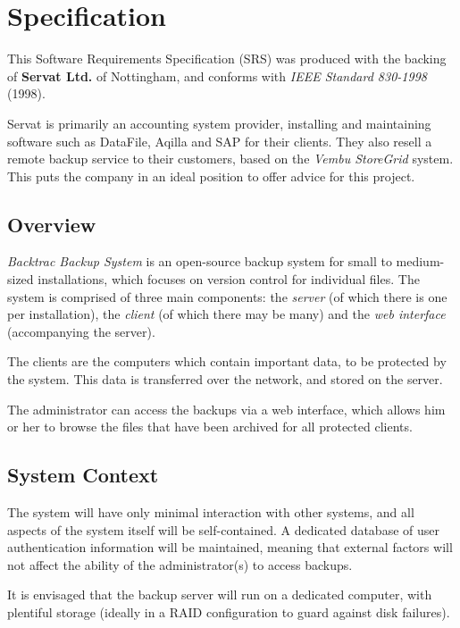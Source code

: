 \chapter{Specification}
\label{chap:specification}

This Software Requirements Specification (SRS) was produced with the backing of
\textbf{Servat Ltd.} of Nottingham, and conforms with \emph{IEEE Standard
830-1998} (1998).

Servat is primarily an accounting system provider, installing and maintaining
software such as DataFile, Aqilla and SAP for their clients. They also resell
a remote backup service to their customers, based on the \emph{Vembu StoreGrid}
system. This puts the company in an ideal position to offer advice for this
project.

\section{Overview}

\emph{Backtrac Backup System} is an open-source backup system for small to
medium-sized installations, which focuses on version control for individual
files. The system is comprised of three main components: the \emph{server} (of
which there is one per installation), the \emph{client} (of which there may be
many) and the \emph{web interface} (accompanying the server).

The clients are the computers which contain important data, to be protected by
the system. This data is transferred over the network, and stored on the
server.

The administrator can access the backups via a web interface, which allows him
or her to browse the files that have been archived for all protected clients.

\section{System Context}

The system will have only minimal interaction with other systems, and all
aspects of the system itself will be self-contained. A dedicated database of
user authentication information will be maintained, meaning that external
factors will not affect the ability of the administrator(s) to access backups.

It is envisaged that the backup server will run on a dedicated computer, with
plentiful storage (ideally in a RAID configuration to guard against disk
failures).

